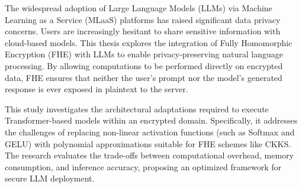 \begin{abstractenv}
    The widespread adoption of Large Language Models (LLMs) via Machine Learning as a Service (MLaaS) platforms has raised significant data privacy concerns. Users are increasingly hesitant to share sensitive information with cloud-based models. This thesis explores the integration of Fully Homomorphic Encryption (FHE) with LLMs to enable privacy-preserving natural language processing. By allowing computations to be performed directly on encrypted data, FHE ensures that neither the user's prompt nor the model's generated response is ever exposed in plaintext to the server. 
    
    This study investigates the architectural adaptations required to execute Transformer-based models within an encrypted domain. Specifically, it addresses the challenges of replacing non-linear activation functions (such as Softmax and GELU) with polynomial approximations suitable for FHE schemes like CKKS. The research evaluates the trade-offs between computational overhead, memory consumption, and inference accuracy, proposing an optimized framework for secure LLM deployment.
\end{abstractenv}